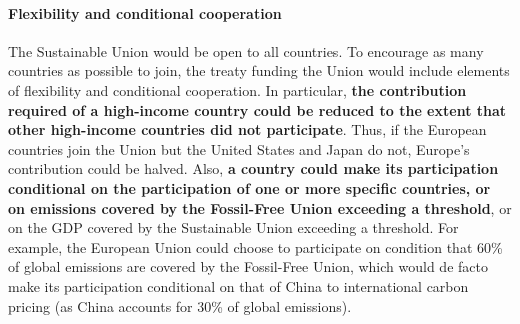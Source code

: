 \documentclass[12pt,english]{article}
\begin{document}
\paragraph{Flexibility and conditional cooperation}
The Sustainable Union would be open to all countries. To encourage as many countries as possible to join, the treaty funding the Union would include elements of flexibility and conditional cooperation. In particular, \textbf{the contribution required of a high-income country could be reduced to the extent that other high-income countries did not participate}. Thus, if the European countries join the Union but the United States and Japan do not, Europe's contribution could be halved. Also, %
\textbf{a country could make its participation conditional on the participation of one or more specific countries, or on emissions covered by the Fossil-Free Union exceeding a threshold}, or on the GDP covered by the Sustainable Union exceeding a threshold. For example, the European Union could choose to participate on condition that 60\% of global emissions are covered by the Fossil-Free Union, which would de facto make its participation conditional on that of China to international carbon pricing (as China accounts for 30\% of global emissions). 
\end{document}
